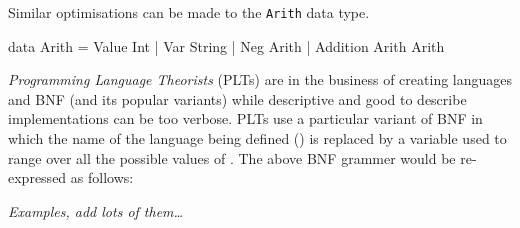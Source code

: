 \begin{bnf}
\end{bnf}

\noindent
Similar optimisations can be made to the \texttt{Arith} data type.

\begin{code}
data Arith = Value Int
           | Var String
           | Neg Arith
           | Addition Arith Arith
\end{code}

\noindent
\emph{Programming Language Theorists} (PLTs) are in the business of creating languages and BNF (and its popular variants) while descriptive and good to describe implementations can be too verbose.
PLTs use a particular variant of BNF in which the name of the language being defined (\allang{}) is replaced by a variable used to range over all the possible values of \allang{}.
The above BNF grammer would be re-expressed as follows:

\begin{bnf}
\end{bnf}

\begin{center}
  \large\em Examples, add lots of them\ldots
\end{center}
